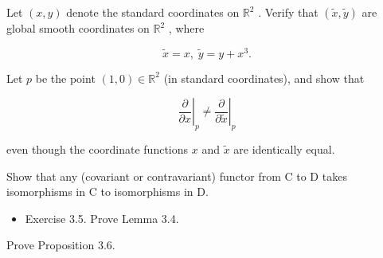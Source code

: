 \begin{exercise}
\label{exer:3-17}


Let $\left( {x, y}\right)$ denote the standard coordinates on ${\mathbb{R}}^{2}$ . Verify that $\left( {\widetilde{x},\widetilde{y}}\right)$ are global smooth coordinates on ${\mathbb{R}}^{2}$ , where

\[
\widetilde{x} = x,\;\widetilde{y} = y + {x}^{3}.
\]

Let $p$ be the point $\left( {1,0}\right)  \in  {\mathbb{R}}^{2}$ (in standard coordinates), and show that

\[
{\left. \frac{\partial }{\partial x}\right| }_{p} \neq  {\left. \frac{\partial }{\partial \widetilde{x}}\right| }_{p}
\]

even though the coordinate functions $x$ and $\widetilde{x}$ are identically equal.
\end{exercise}

\begin{exercise}
\label{exer:3-27}


Show that any (covariant or contravariant) functor from C to D takes isomorphisms in C to isomorphisms in D.
\end{exercise}

\begin{exercise}
\label{exer:3-5}


\begin{itemize}
\item Exercise 3.5. Prove Lemma 3.4.
\end{itemize}
\end{exercise}

\begin{exercise}
\label{exer:3-7}


Prove Proposition 3.6.
\end{exercise}
